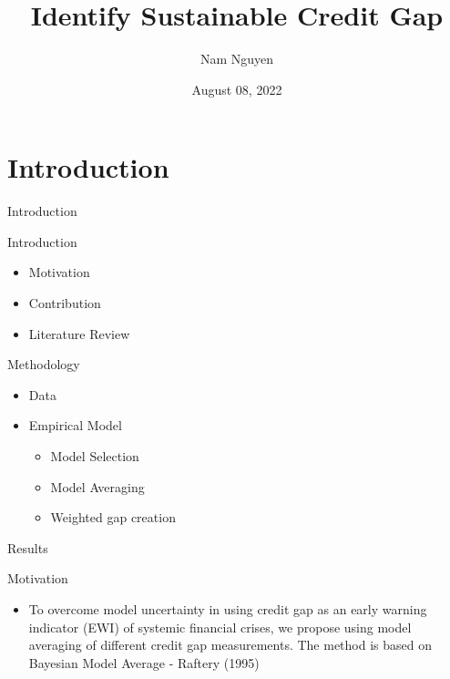 \documentclass[
  ignorenonframetext,
]{beamer}
\title{Identify Sustainable Credit Gap}
\author{Nam Nguyen}
\date{August 08, 2022}
\institute{UWM}
\providecommand{\tightlist}{%
  \setlength{\itemsep}{0pt}\setlength{\parskip}{0pt}}
\begin{document}
\frame{\titlepage}

\hypertarget{introduction}{%
\section{Introduction}\label{introduction}}

\begin{frame}{Introduction}
\begin{block}{Introduction}
\protect\hypertarget{introduction-1}{}
\begin{itemize}
\tightlist
\item
  Motivation
\item
  Contribution
\item
  Literature Review
\end{itemize}
\end{block}

\begin{block}{Methodology}
\protect\hypertarget{methodology}{}
\begin{itemize}
\tightlist
\item
  Data
\item
  Empirical Model

  \begin{itemize}
  \tightlist
  \item
    Model Selection
  \item
    Model Averaging
  \item
    Weighted gap creation
  \end{itemize}
\end{itemize}
\end{block}

\begin{block}{Results}
\protect\hypertarget{results}{}
\end{block}
\end{frame}

\begin{frame}{Motivation}
\protect\hypertarget{motivation}{}
\begin{itemize}
\tightlist
\item
  To overcome model uncertainty in using credit gap as an early warning
  indicator (EWI) of systemic financial crises, we propose using model
  averaging of different credit gap measurements. The method is based on
  Bayesian Model Average - Raftery (1995)
\end{itemize}
\end{frame}
\end{document}
